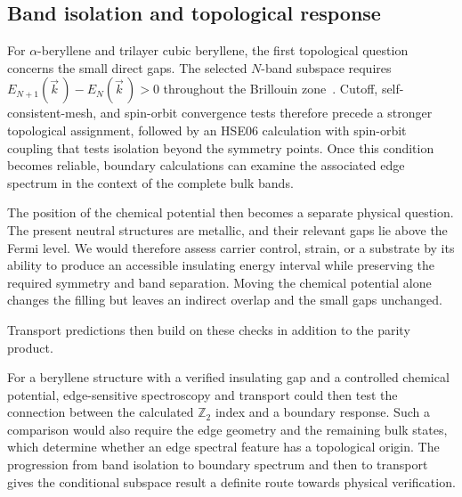 \FloatBarrier
\subsection{Band isolation and topological response}

For $\alpha$-beryllene and trilayer cubic beryllene, the first topological question concerns the small direct gaps.
The selected $N$-band subspace requires $E_{N+1}(\vec{k}\,)-E_N(\vec{k}\,)>0$ throughout the Brillouin zone~\cite{fu2007topological,gresch2017z2pack}.
Cutoff, self-consistent-mesh, and spin-orbit convergence tests therefore precede a stronger topological assignment, followed by an HSE06 calculation with spin-orbit coupling that tests isolation beyond the symmetry points.
Once this condition becomes reliable, boundary calculations can examine the associated edge spectrum in the context of the complete bulk bands.

The position of the chemical potential then becomes a separate physical question.
The present neutral structures are metallic, and their relevant gaps lie above the Fermi level.
We would therefore assess carrier control, strain, or a substrate by its ability to produce an accessible insulating energy interval while preserving the required symmetry and band separation.
Moving the chemical potential alone changes the filling but leaves an indirect overlap and the small gaps unchanged.

Transport predictions then build on these checks in addition to the parity product.

For a beryllene structure with a verified insulating gap and a controlled chemical potential, edge-sensitive spectroscopy and transport could then test the connection between the calculated $\mathbb{Z}_2$ index and a boundary response.
Such a comparison would also require the edge geometry and the remaining bulk states, which determine whether an edge spectral feature has a topological origin.
The progression from band isolation to boundary spectrum and then to transport gives the conditional subspace result a definite route towards physical verification.

